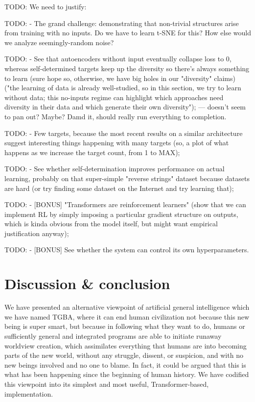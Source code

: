 \documentclass{article}
\begin{document}
    TODO: We need to justify:

    TODO: - The grand challenge: demonstrating that non-trivial structures arise from training with no inputs. Do we have to learn t-SNE for this? How else would we analyze seemingly-random noise?

    TODO: - See that autoencoders without input eventually collapse loss to 0, whereas self-determined targets keep up the diversity so there's always something to learn (sure hope so, otherwise, we have big holes in our "diversity" claims) ("the learning of data is already well-studied, so in this section, we try to learn without data; this no-inputs regime can highlight which approaches need diversity in their data and which generate their own diversity"); --- doesn't seem to pan out? Maybe? Damd it, should really run everything to completion.

    TODO: - Few targets, because the most recent results on a similar architecture suggest interesting things happening with many targets (so, a plot of what happens as we increase the target count, from 1 to MAX);

    TODO: - See whether self-determination improves performance on actual learning, probably on that super-simple "reverse strings" dataset because datasets are hard (or try finding some dataset on the Internet and try learning that);

    TODO: - [BONUS] "Transformers are reinforcement learners" (show that we can implement RL by simply imposing a particular gradient structure on outputs, which is kinda obvious from the model itself, but might want empirical justification anyway);

    TODO: - [BONUS] See whether the system can control its own hyperparameters.

\section{Discussion & conclusion}

We have presented an alternative viewpoint of artificial general intelligence which we have named TGBA, where it can end human civilization not because this new being is super smart, but because in following what they want to do, humans or sufficiently general and integrated programs are able to initiate runaway worldview creation, which assimilates everything that humans are into becoming parts of the new world, without any struggle, dissent, or suspicion, and with no new beings involved and no one to blame. In fact, it could be argued that this is what has been happening since the beginning of human history. We have codified this viewpoint into its simplest and most useful, Transformer-based, implementation.
\end{document}
